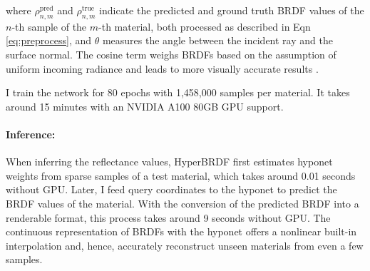 where $\rho^{\text{pred}}_{n, m}$ and $\rho^{\text{true}}_{n, m}$ indicate the predicted and ground truth \gls{BRDF} values of the $n$-th sample of the $m$-th material, both processed as described in Eqn \ref{eq:preprocess}, and $\theta$ measures the angle between the incident ray and the surface normal. The cosine term weighs \gls{BRDF}s based on the assumption of uniform incoming radiance and leads to more visually accurate results \cite{ngan2005experimental}.


I train the network for 80 epochs with 1,458,000 samples per material. It takes around 15 minutes with an NVIDIA A100 80GB GPU support. 


\paragraph{Inference:}
When inferring the reflectance values, HyperBRDF first estimates hyponet weights from sparse samples of a test material, which takes around 0.01 seconds without GPU. Later, I feed query coordinates to the hyponet to predict the \gls{BRDF} values of the material. With the conversion of the predicted \gls{BRDF} into a renderable format, this process takes around 9 seconds without GPU. The continuous representation of \gls{BRDF}s with the hyponet offers a nonlinear built-in interpolation and, hence, accurately reconstruct unseen materials from even a few samples.